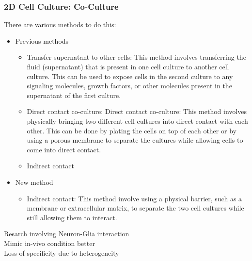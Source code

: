 \begin{itemize}
\subsubsection{2D Cell Culture: Co-Culture}
There are various methods
to do this:
\begin{itemize}
    \item Previous methods
    \begin{itemize}
        \item Transfer supernatant to other cells: This method involves transferring the fluid (supernatant) that is present in one cell culture to another cell culture. This can be used to expose cells in the second culture to any signaling molecules, growth factors, or other molecules present in the supernatant of the first culture.

        \item Direct contact co-culture: Direct contact co-culture: This method involves physically bringing two different cell cultures into direct contact with each other. This can be done by plating the cells on top of each other or by using a porous membrane to separate the cultures while allowing cells to come into direct contact.

        \item Indirect contact
    \end{itemize}
    \item New method
    \begin{itemize}
        \item Indirect contact: This method involve using a physical barrier, such as a membrane or extracellular matrix, to separate the two cell cultures while still allowing them to interact.
    \end{itemize}
\end{itemize}
Resarch involving Neuron-Glia interaction
\\Mimic in-vivo condition better
\\Loss of specificity due to heterogeneity


\end{itemize}
